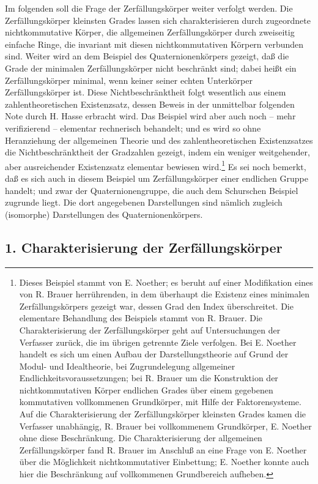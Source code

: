 \documentclass[11pt]{article}
\begin{document}
Im folgenden soll die Frage der Zerfällungskörper weiter verfolgt werden. Die Zerfällungskörper kleinsten Grades lassen sich charakterisieren durch zugeordnete nichtkommutative Körper, die allgemeinen Zerfällungskörper durch zweiseitig einfache Ringe, die invariant mit diesen nichtkommutativen Körpern verbunden sind. Weiter wird an dem Beispiel des Quaternionenkörpers gezeigt, daß die Grade der minimalen Zerfällungskörper nicht beschränkt sind; dabei heißt ein Zerfällungskörper minimal, wenn keiner seiner echten Unterkörper Zerfällungskörper ist. Diese Nichtbeschränktheit folgt wesentlich aus einem zahlentheoretischen Existenzsatz, dessen Beweis in der unmittelbar folgenden Note durch H. Hasse erbracht wird. Das Beispiel wird aber auch noch -- mehr verifizierend -- elementar rechnerisch behandelt; und es wird so ohne Heranziehung der allgemeinen Theorie und des zahlentheoretischen Existenzsatzes die Nichtbeschränktheit der Gradzahlen gezeigt, indem ein weniger weitgehender, aber ausreichender Existenzsatz elementar bewiesen wird.\footnote{Dieses Beispiel stammt von E. Noether; es beruht auf einer Modifikation eines von R. Brauer herrührenden, in dem überhaupt die Existenz eines minimalen Zerfällungskörpers gezeigt war, dessen Grad den Index überschreitet. Die elementare Behandlung des Beispiels stammt von R. Brauer. Die Charakterisierung der Zerfällungskörper geht auf Untersuchungen der Verfasser zurück, die im übrigen getrennte Ziele verfolgen. Bei E. Noether handelt es sich um einen Aufbau der Darstellungstheorie auf Grund der Modul- und Idealtheorie, bei Zugrundelegung allgemeiner Endlichkeitsvoraussetzungen; bei R. Brauer um die Konstruktion der nichtkommutativen Körper endlichen Grades über einem gegebenen kommutativen vollkommenen Grundkörper, mit Hilfe der Faktorensysteme. Auf die Charakterisierung der Zerfällungskörper kleinsten Grades kamen die Verfasser unabhängig, R. Brauer bei vollkommenem Grundkörper, E. Noether ohne diese Beschränkung. Die Charakterisierung der allgemeinen Zerfällungskörper fand R. Brauer im Anschluß an eine Frage von E. Noether über die Möglichkeit nichtkommutativer Einbettung; E. Noether konnte auch hier die Beschränkung auf vollkommenen Grundbereich aufheben.} Es sei noch bemerkt, daß es sich auch in diesem Beispiel um Zerfällungskörper einer endlichen Gruppe handelt; und zwar der Quaternionengruppe, die auch dem Schurschen Beispiel zugrunde liegt. Die dort angegebenen Darstellungen sind nämlich zugleich (isomorphe) Darstellungen des Quaternionenkörpers.

\subsection*{1. Charakterisierung der Zerfällungskörper}
\end{document}
